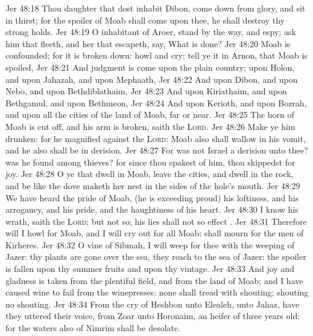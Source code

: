 \vs Jer 48:18 Thou daughter that dost inhabit Dibon, come down from  glory, and sit in thirst; for the spoiler of Moab shall come upon thee,  he shall destroy thy strong holds.
\vs Jer 48:19 O inhabitant of Aroer, stand by the way, and espy; ask him that fleeth, and her that escapeth,  say, What is done?
\vs Jer 48:20 Moab is confounded; for it is broken down: howl and cry; tell ye it in Arnon, that Moab is spoiled,
\vs Jer 48:21 And judgment is come upon the plain country; upon Holon, and upon Jahazah, and upon Mephaath,
\vs Jer 48:22 And upon Dibon, and upon Nebo, and upon Bethdiblathaim,
\vs Jer 48:23 And upon Kiriathaim, and upon Bethgamul, and upon Bethmeon,
\vs Jer 48:24 And upon Kerioth, and upon Bozrah, and upon all the cities of the land of Moab, far or near.
\vs Jer 48:25 The horn of Moab is cut off, and his arm is broken, saith the \textsc{Lord}.
\vs Jer 48:26 Make ye him drunken: for he magnified  against the \textsc{Lord}: Moab also shall wallow in his vomit, and he also shall be in derision.
\vs Jer 48:27 For was not Israel a derision unto thee? was he found among thieves? for since thou spakest of him, thou skippedst for joy.
\vs Jer 48:28 O ye that dwell in Moab, leave the cities, and dwell in the rock, and be like the dove  maketh her nest in the sides of the hole's mouth.
\vs Jer 48:29 We have heard the pride of Moab, (he is exceeding proud) his loftiness, and his arrogancy, and his pride, and the haughtiness of his heart.
\vs Jer 48:30 I know his wrath, saith the \textsc{Lord}; but  not  so; his lies shall not so effect .
\vs Jer 48:31 Therefore will I howl for Moab, and I will cry out for all Moab;  shall mourn for the men of Kirheres.
\vs Jer 48:32 O vine of Sibmah, I will weep for thee with the weeping of Jazer: thy plants are gone over the sea, they reach  to the sea of Jazer: the spoiler is fallen upon thy summer fruits and upon thy vintage.
\vs Jer 48:33 And joy and gladness is taken from the plentiful field, and from the land of Moab; and I have caused wine to fail from the winepresses: none shall tread with shouting;  shouting  no shouting.
\vs Jer 48:34 From the cry of Heshbon  unto Elealeh,  unto Jahaz, have they uttered their voice, from Zoar  unto Horonaim,  an heifer of three years old: for the waters also of Nimrim shall be desolate.
